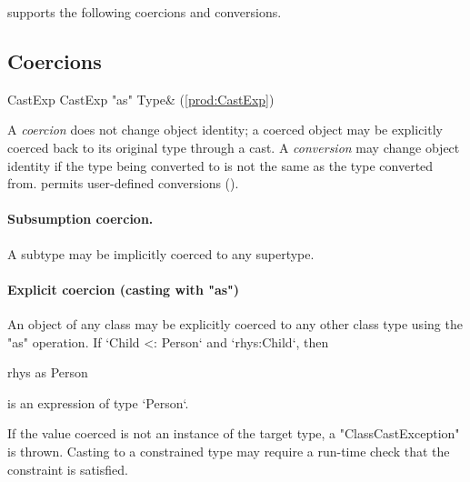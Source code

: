 \XtenCurrVer{} supports the following coercions and conversions.

\subsection{Coercions}

\begin{bbgrammar}
 CastExp    \:  CastExp \xcd"as" Type& (\ref{prod:CastExp})\\%
\end{bbgrammar}


A {\em coercion} does not change object identity; a coerced object may
be explicitly coerced back to its original type through a cast. A {\em
  conversion} may change object identity if the type being converted
to is not the same as the type converted from. \Xten{} permits
user-defined conversions ().

\paragraph{Subsumption coercion.}
A subtype may be implicitly coerced to any supertype.

\paragraph{Explicit coercion (casting with \xcd"as")}



An object of any class may be explicitly coerced to any other
class type using the \xcd"as" operation.  If \xcd`Child <: Person` and
\xcd`rhys:Child`, then 
\begin{xten}
  rhys as Person
\end{xten}
is an expression of type \xcd`Person`.  

If the value coerced is not an instance of the target type,
a \xcd"ClassCastException" is thrown.  Casting to a constrained
type may require a run-time check that the constraint is
satisfied.


